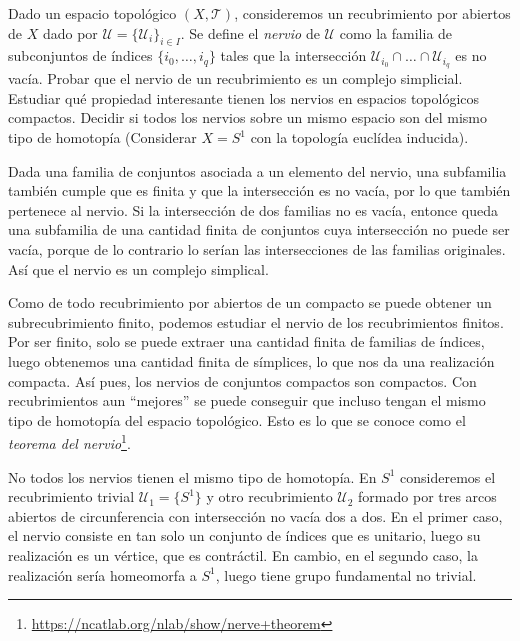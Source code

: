 \documentclass[twoside]{article}
\begin{document}
\newpage

\begin{ejercicio}{1.9}
Dado un  espacio topológico $(X,\mathcal{T})$, consideremos un recubrimiento por abiertos de $X$ dado por $\mathcal{U} = \{\mathcal{U}_i\}_{i \in I}$.
Se define el \emph{nervio} de $\mathcal{U}$ como la familia de subconjuntos de índices $\{i_0,\dots,i_q\}$ tales que la intersección $\mathcal{U}_{i_0} \cap \dots \cap \mathcal{U}_{i_q}$ es no vacía.
Probar que el nervio de un recubrimiento es un complejo simplicial.
Estudiar qué propiedad interesante tienen los nervios en espacios topológicos compactos.
Decidir si todos los nervios sobre un mismo espacio son del mismo tipo de homotopía
(Considerar $X = S^1$ con la topología euclídea inducida).
\end{ejercicio}
\begin{solucion}
Dada una familia de conjuntos asociada a un elemento del nervio, una subfamilia también cumple que es finita y que la intersección es no vacía, por lo que también pertenece al nervio. Si la intersección de dos familias no es vacía, entonce queda una subfamilia de una cantidad finita de conjuntos cuya intersección no puede ser vacía, porque de lo contrario lo serían las intersecciones de las familias originales. Así que el nervio es un complejo simplical.

Como de todo recubrimiento por abiertos de un compacto se puede obtener un subrecubrimiento finito, podemos estudiar el nervio de los recubrimientos finitos. Por ser finito, solo se puede extraer una cantidad finita de familias de índices, luego obtenemos una cantidad finita de símplices, lo que nos da una realización compacta. Así pues, los nervios de conjuntos compactos son compactos. Con recubrimientos aun ``mejores'' se puede conseguir que incluso tengan el mismo tipo de homotopía del espacio topológico. Esto es lo que se conoce como el \emph{teorema del nervio}\footnote{\url{https://ncatlab.org/nlab/show/nerve+theorem}}.

No todos los nervios tienen el mismo tipo de homotopía. En $S^1$ consideremos el recubrimiento trivial $\mathcal{U}_1=\{S^1\}$ y otro recubrimiento $\mathcal{U}_2$ formado por tres arcos abiertos de circunferencia con intersección no vacía dos a dos. En el primer caso, el nervio consiste en tan solo un conjunto de índices que es unitario, luego su realización es un vértice, que es contráctil. En cambio, en el segundo caso, la realización sería homeomorfa a $S^1$, luego tiene grupo fundamental no trivial. 
\end{solucion}
\end{document}
